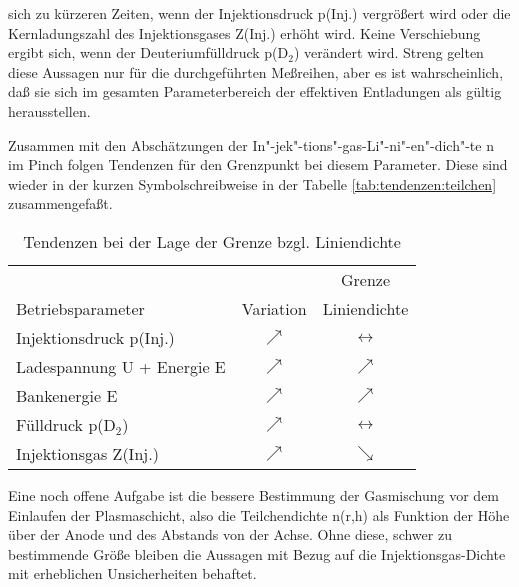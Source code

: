 sich zu kürzeren Zeiten, wenn der Injektionsdruck p(Inj.) vergrößert
wird oder die Kernladungszahl des Injektionsgases Z(Inj.) erhöht wird.
Keine Verschiebung ergibt sich, wenn der Deuteriumfülldruck p(D$_2$)
verändert wird. Streng gelten diese Aussagen nur für die durchgeführten
Meßreihen, aber es ist wahrscheinlich, daß sie sich im gesamten
Parameterbereich der effektiven Entladungen als gültig herausstellen.
\par
Zusammen mit den Abschätzungen der
In"-jek"-tions"-gas-Li"-ni"-en"-dich"-te n im Pinch folgen
Tendenzen für den Grenzpunkt bei diesem Parameter. Diese sind
wieder in der kurzen Symbolschreibweise in der Tabelle
\vref{tab:tendenzen:teilchen} zusammengefaßt.
%
\begin{table}[H]
  \center
  \begin{tabular}{|l|c|c|}
      \hline
                                &            & Grenze            \\
    Betriebsparameter           & Variation  & Liniendichte      \\
      \hline
    Injektionsdruck p(Inj.)     & $\nearrow$ & $\leftrightarrow$ \\
    Ladespannung U + Energie E  & $\nearrow$ & $\nearrow$        \\
    Bankenergie E               & $\nearrow$ & $\nearrow$        \\
    Fülldruck p(D$_2$)          & $\nearrow$ & $\leftrightarrow$ \\
    Injektionsgas Z(Inj.)    & $\nearrow$ & $\searrow$        \\
      \hline
  \end{tabular}
  \caption{Tendenzen bei der Lage der Grenze bzgl. Liniendichte}
  \label{tab:tendenzen:teilchen}
\end{table}
%
\par
Eine noch offene Aufgabe ist die bessere Bestimmung der Gasmischung vor
dem Einlaufen der Plasmaschicht, also die Teilchendichte n(r,h) als
Funktion der Höhe über der Anode und des Abstands von der Achse. Ohne
diese, schwer zu bestimmende Größe bleiben die Aussagen mit Bezug auf
die Injektionsgas-Dichte mit erheblichen Unsicherheiten behaftet.
